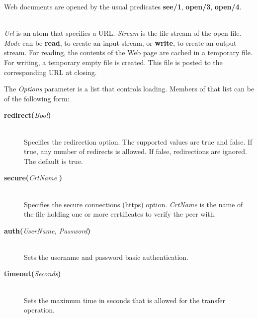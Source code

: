 Web documents are opened by the usual predicates {\bf see/1}, {\bf open/3},
{\bf open/4}.

\begin{description}

\item[see({\it url}({\it +Url}))]\mbox{}
\item[see({\it url}({\it +Url,Options}))]\mbox{}
\item[open({\it url}({\it +Url}), {\it +Mode}, {\it -Stream})]\mbox{}
\item[open({\it url}({\it +Url}), {\it +Mode}, {\it -Stream}, {\it +Options})]\mbox{}
  \\

{\it Url} is an atom that specifies a URL.
\emph{Stream} is the file stream of the open file.
{\it Mode} can be
\textbf{read}, to create an input stream, or
{\bf write},  to create an output stream.
For reading, the contents of the Web page are cached in a temporary file.
For writing, a temporary empty file is created. This file is posted to the
corresponding URL at closing.

The {\it Options} parameter is a list that controls loading. Members of that list can be of the following form:

  \begin{description}
  \item[{\bf redirect}{\bf (}{\it Bool}{\bf )}]\mbox{}
    \\
    Specifies the redirection option. The supported values are true and
    false. If true, any number of redirects is allowed. If false,
    redirections are ignored.
    The default is true.

  \item[{\bf secure}{\bf (}{\it CrtName}{\bf
    )}]\mbox{}
    \\
    Specifies the secure connections (https) option. \emph{CrtName} is the name of the file holding one or more certificates to verify the peer with. 

  \item[{\bf auth}{\bf (}{\it UserName, \it Password}{\bf )}]\mbox{}\\Sets the username and password basic authentication.

  \item[{\bf timeout}{\bf (}{\it Seconds}{\bf )}]\mbox{}\\Sets the maximum time in seconds that is allowed for the transfer operation.


\end{description}
\end{description}
